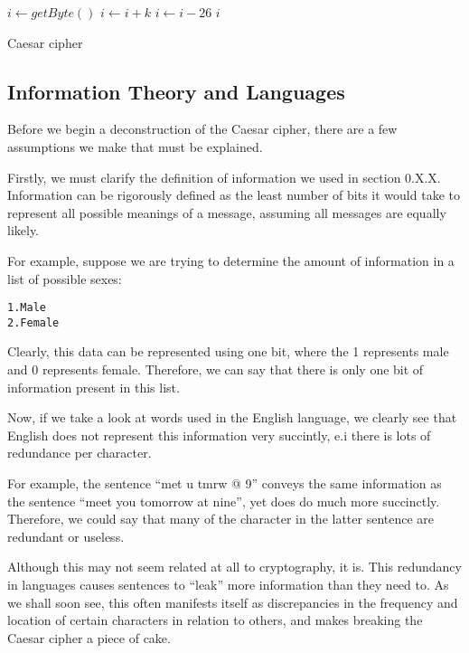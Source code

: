 \documentclass[12pt, a4paper, draft]{report}
\begin{document}
\begin{algorithm}
\begin{algorithmic}
    \State $i\gets getByte()$
    \State $i\gets i + k$
        \State $i\gets i - 26$
    \EndIf
    \State \Return $i$
\end{algorithmic}
\caption{Caesar cipher}
\end{algorithm}


\subsection{Information Theory and Languages}

Before we begin a deconstruction of the Caesar cipher, there are a few
assumptions we make that must be explained.

Firstly, we must clarify the definition of information we used in section
0.X.X. Information can be rigorously defined as the least number of bits
it would take to represent all possible meanings of a message, assuming
all messages are equally likely.

For example, suppose we are trying to determine the amount of information
in a list of possible sexes:

\begin{center}
\begin{alltt}
1. Male
2. Female
\end{alltt}
\end{center}

Clearly, this data can be represented using one bit, where the 1
represents male and 0 represents female. Therefore, we can say that there
is only one bit of information present in this list.

Now, if we take a look at words used in the English language, we clearly
see that English does not represent this information very succintly, e.i
there is lots of redundance per character.

For example, the sentence ``met u tmrw @ 9'' conveys the same information
as the sentence ``meet you tomorrow at nine'', yet does do much more
succinctly. Therefore, we could say that many of the character in the
latter sentence are redundant or useless.

Although this may not seem related at all to cryptography, it is. This
redundancy in languages causes sentences to ``leak'' more information than
they need to. As we shall soon see, this often manifests itself as
discrepancies in the frequency and location of certain characters in
relation to others, and makes breaking the Caesar cipher a piece of
cake.
\end{document}
